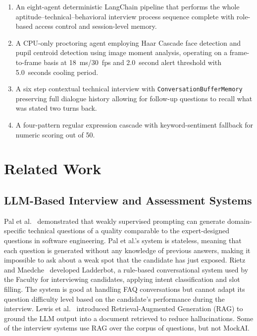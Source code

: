 \documentclass[conference]{IEEEtran}
\begin{document}
\begin{enumerate}
  \item An eight-agent deterministic LangChain pipeline that performs
        the whole aptitude--technical--behavioral interview process
        sequence complete with role-based access control and
        session-level memory.
  \item A CPU-only proctoring agent employing Haar Cascade face
        detection and pupil centroid detection using image moment
        analysis, operating on a frame-to-frame basis at 18~ms/30~fps
        and 2.0~second alert threshold with 5.0~seconds cooling period.
  \item A six step contextual technical interview with
        \texttt{ConversationBufferMemory} preserving full dialogue
        history allowing for follow-up questions to recall what was
        stated two turns back.
  \item A four-pattern regular expression cascade with
        keyword-sentiment fallback for numeric scoring out of 50.
\end{enumerate}

\section{Related Work}

\subsection{LLM-Based Interview and Assessment Systems}

Pal et al.~\cite{pal2022interview} demonstrated that weakly supervised
prompting can generate domain-specific technical questions of a quality
comparable to the expert-designed questions in software engineering.
Pal et al.'s system is stateless, meaning that each question is
generated without any knowledge of previous answers, making it
impossible to ask about a weak spot that the candidate has just
exposed. Rietz and Maedche~\cite{rietz2023ladderbot} developed
Ladderbot, a rule-based conversational system used by the Faculty for
interviewing candidates, applying intent classification and slot
filling. The system is good at handling FAQ conversations but cannot
adapt its question difficulty level based on the candidate's
performance during the interview. Lewis et al.~\cite{lewis2020rag}
introduced Retrieval-Augmented Generation (RAG) to ground the LLM
output into a document retrieved to reduce hallucinations. Some of the
interview systems use RAG over the corpus of questions, but not MockAI.
\end{document}
